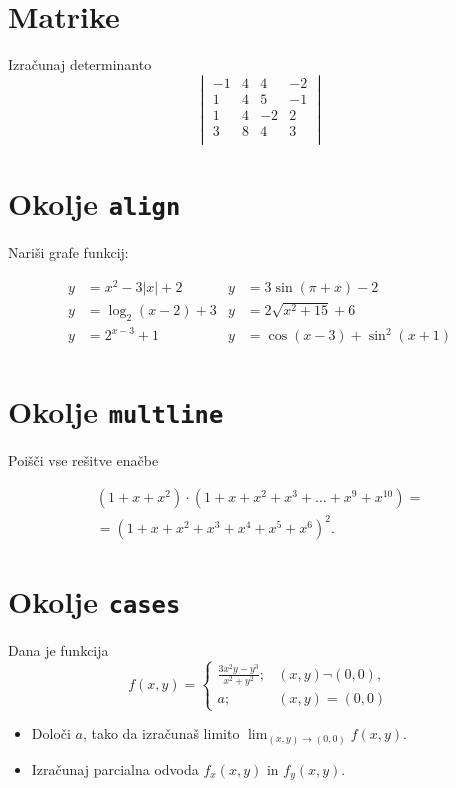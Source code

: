 \documentclass[a4paper,12pt]{article}
\begin{document}
\section*{Matrike}
Izračunaj determinanto
\[
\begin{vmatrix}
    -1 & 4 & 4 & -2 \\
    1 & 4 & 5 & -1 \\
    1 & 4 & -2 & 2 \\
    3 & 8 & 4 & 3 \\
\end{vmatrix}
\]

\section*{Okolje \texttt{align}}
Nariši grafe funkcij:

\begin{align*}
   y &= x^2 - 3|x| + 2   & y &= 3 \sin(\pi+x) - 2 \\
   y &= \log_2(x-2) + 3  & y &= 2 \sqrt{x^2+15} + 6 \\
   y &= 2^{x-3} + 1      & y &= \cos(x-3) + \sin^2(x+1) \\
\end{align*}

\section*{Okolje \texttt{multline}}
Poišči vse rešitve enačbe

\begin{multline*}
   (1+x+x^2) \cdot (1+x+x^2+x^3+\ldots+x^9+x^{10}) = \\
   =(1+x+x^2+x^3+x^4+x^5+x^6)^2.
\end{multline*}

\section*{Okolje \texttt{cases}}
Dana je funkcija
\[
f(x,y) =
\begin{cases}
   \frac{3x^2y-y^3}{x^2+y^2}; & (x,y) \neg (0,0), \\
   a; & (x,y) = (0,0)
\end{cases}
\]
\begin{itemize}
\item Določi \(a\), tako da izračunaš limito \( \lim_{(x,y)\to(0,0)} f(x,y) \).
\item Izračunaj parcialna odvoda \(f_x(x,y)\) in \(f_y(x,y)\).
\end{itemize}
\end{document}
